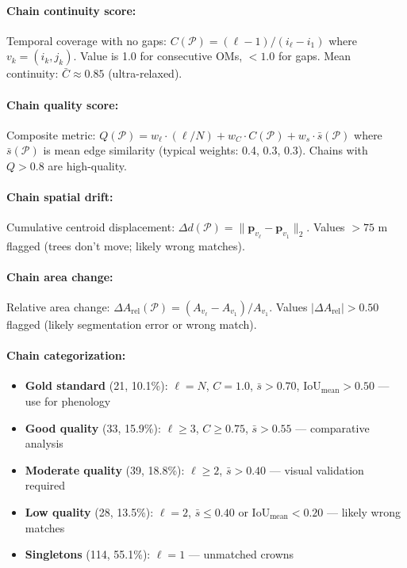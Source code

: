 \paragraph{Chain continuity score:}
Temporal coverage with no gaps: $C(\mathcal{P}) = (\ell - 1)/(i_\ell - i_1)$ where $v_k = (i_k, j_k)$. Value is 1.0 for consecutive OMs, $< 1.0$ for gaps. Mean continuity: $\bar{C} \approx 0.85$ (ultra-relaxed).

\paragraph{Chain quality score:}
Composite metric: $Q(\mathcal{P}) = w_{\ell} \cdot (\ell/N) + w_C \cdot C(\mathcal{P}) + w_s \cdot \bar{s}(\mathcal{P})$ where $\bar{s}(\mathcal{P})$ is mean edge similarity (typical weights: 0.4, 0.3, 0.3). Chains with $Q > 0.8$ are high-quality.

\paragraph{Chain spatial drift:}
Cumulative centroid displacement: $\Delta d(\mathcal{P}) = \|\mathbf{p}_{v_\ell} - \mathbf{p}_{v_1}\|_2$. Values $> 75$ m flagged (trees don't move; likely wrong matches).

\paragraph{Chain area change:}
Relative area change: $\Delta A_{\text{rel}}(\mathcal{P}) = (A_{v_\ell} - A_{v_1})/A_{v_1}$. Values $|\Delta A_{\text{rel}}| > 0.50$ flagged (likely segmentation error or wrong match).

\paragraph{Chain categorization:}
\begin{itemize}[leftmargin=*, itemsep=1pt]
    \item \textbf{Gold standard} (21, 10.1\%): $\ell = N$, $C = 1.0$, $\bar{s} > 0.70$, $\text{IoU}_{\text{mean}} > 0.50$ — use for phenology
    \item \textbf{Good quality} (33, 15.9\%): $\ell \geq 3$, $C \geq 0.75$, $\bar{s} > 0.55$ — comparative analysis
    \item \textbf{Moderate quality} (39, 18.8\%): $\ell \geq 2$, $\bar{s} > 0.40$ — visual validation required
    \item \textbf{Low quality} (28, 13.5\%): $\ell = 2$, $\bar{s} \leq 0.40$ or $\text{IoU}_{\text{mean}} < 0.20$ — likely wrong matches
    \item \textbf{Singletons} (114, 55.1\%): $\ell = 1$ — unmatched crowns
\end{itemize}

